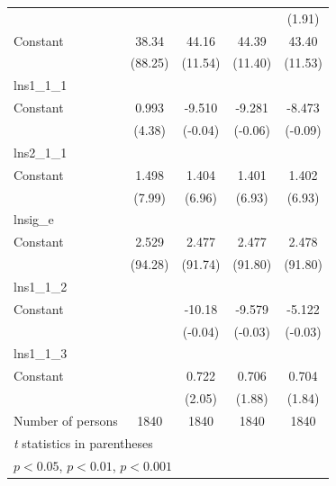 \begin{table}[htbp]
\begin{tabular}{l*{4}{c}}
                    &                     &                     &                     &      (1.91)         \\
\addlinespace
Constant            &       38.34\sym{***}&       44.16\sym{***}&       44.39\sym{***}&       43.40\sym{***}\\
                    &     (88.25)         &     (11.54)         &     (11.40)         &     (11.53)         \\
\midrule
lns1\_1\_1            &                     &                     &                     &                     \\
Constant            &       0.993\sym{***}&      -9.510         &      -9.281         &      -8.473         \\
                    &      (4.38)         &     (-0.04)         &     (-0.06)         &     (-0.09)         \\
\midrule
lns2\_1\_1            &                     &                     &                     &                     \\
Constant            &       1.498\sym{***}&       1.404\sym{***}&       1.401\sym{***}&       1.402\sym{***}\\
                    &      (7.99)         &      (6.96)         &      (6.93)         &      (6.93)         \\
\midrule
lnsig\_e             &                     &                     &                     &                     \\
Constant            &       2.529\sym{***}&       2.477\sym{***}&       2.477\sym{***}&       2.478\sym{***}\\
                    &     (94.28)         &     (91.74)         &     (91.80)         &     (91.80)         \\
\midrule
lns1\_1\_2            &                     &                     &                     &                     \\
Constant            &                     &      -10.18         &      -9.579         &      -5.122         \\
                    &                     &     (-0.04)         &     (-0.03)         &     (-0.03)         \\
\midrule
lns1\_1\_3            &                     &                     &                     &                     \\
Constant            &                     &       0.722\sym{*}  &       0.706         &       0.704         \\
                    &                     &      (2.05)         &      (1.88)         &      (1.84)         \\
\midrule
Number of persons   &        1840         &        1840         &        1840         &        1840         \\
\bottomrule
\multicolumn{5}{l}{\footnotesize \textit{t} statistics in parentheses}\\
\multicolumn{5}{l}{\footnotesize \sym{*} \(p<0.05\), \sym{**} \(p<0.01\), \sym{***} \(p<0.001\)}\\
\end{tabular}
\end{table}
